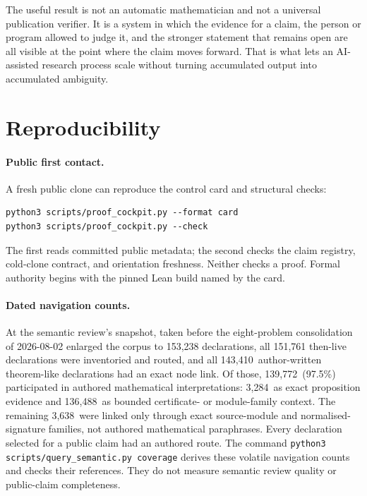 \documentclass[10pt]{article}
\newcommand{\SemanticAuthoredTheoremLike}{143,410}
\newcommand{\SemanticAuthoredInterpreted}{139,772}
\newcommand{\SemanticDirectEvidence}{3,284}
\newcommand{\SemanticContextual}{136,488}
\newcommand{\SemanticStructuralOnly}{3,638}
\newcommand{\SemanticAuthoredPercent}{97.5}
\begin{document}
The useful result is not an automatic mathematician and not a universal
publication verifier. It is a system in which the evidence for a claim, the
person or program allowed to judge it, and the stronger statement that remains
open are all visible at the point where the claim moves forward. That is what
lets an AI-assisted research process scale without turning accumulated output
into accumulated ambiguity.

\appendix
\small
\section{Reproducibility}\label{app:repro}

\paragraph{Public first contact.}
A fresh public clone can reproduce the control card and structural checks:
\begin{verbatim}
python3 scripts/proof_cockpit.py --format card
python3 scripts/proof_cockpit.py --check
\end{verbatim}
The first reads committed public metadata; the second checks the claim
registry, cold-clone contract, and orientation freshness.  Neither checks a
proof.  Formal authority begins with the pinned Lean build named by the card.

\paragraph{Dated navigation counts.}
At the semantic review's snapshot, taken before the eight-problem
consolidation of 2026-08-02 enlarged the corpus to 153,238 declarations, all
151,761 then-live declarations were inventoried and routed, and all
\SemanticAuthoredTheoremLike\ author-written theorem-like
declarations had an exact node link.  Of those,
\SemanticAuthoredInterpreted\ (\SemanticAuthoredPercent\%) participated in
authored mathematical interpretations: \SemanticDirectEvidence\ as exact
proposition evidence and \SemanticContextual\ as bounded certificate- or
module-family context.  The remaining \SemanticStructuralOnly\ were linked only
through exact source-module and normalised-signature families, not authored
mathematical paraphrases.  Every declaration selected for a public claim had
an authored route.  The command
\texttt{python3 scripts/query\_semantic.py coverage} derives these volatile
navigation counts and checks their references.  They do not measure semantic
review quality or public-claim completeness.
\end{document}
